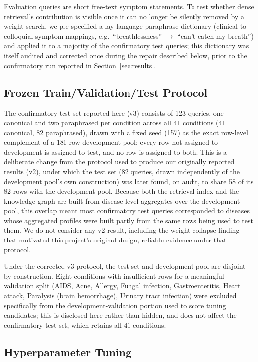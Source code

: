 \documentclass[10pt,conference]{IEEEtran}
\begin{document}
Evaluation queries are short free-text symptom statements. To test whether dense retrieval's contribution is visible once it can no longer be silently removed by a weight search, we pre-specified a lay-language paraphrase dictionary (clinical-to-colloquial symptom mappings, e.g.\ ``breathlessness'' $\rightarrow$ ``can't catch my breath'') and applied it to a majority of the confirmatory test queries; this dictionary was itself audited and corrected once during the repair described below, prior to the confirmatory run reported in Section~\ref{sec:results}.

\subsection{Frozen Train/Validation/Test Protocol}
\label{ssec:protocol}

The confirmatory test set reported here (v3) consists of 123 queries, one canonical and two paraphrased per condition across all 41 conditions (41 canonical, 82 paraphrased), drawn with a fixed seed (157) as the exact row-level complement of a 181-row development pool: every row not assigned to development is assigned to test, and no row is assigned to both. This is a deliberate change from the protocol used to produce our originally reported results (v2), under which the test set (82 queries, drawn independently of the development pool's own construction) was later found, on audit, to share 58 of its 82 rows with the development pool. Because both the retrieval index and the knowledge graph are built from disease-level aggregates over the development pool, this overlap meant most confirmatory test queries corresponded to diseases whose aggregated profiles were built partly from the same rows being used to test them. We do not consider any v2 result, including the weight-collapse finding that motivated this project's original design, reliable evidence under that protocol.

Under the corrected v3 protocol, the test set and development pool are disjoint by construction. Eight conditions with insufficient rows for a meaningful validation split (AIDS, Acne, Allergy, Fungal infection, Gastroenteritis, Heart attack, Paralysis (brain hemorrhage), Urinary tract infection) were excluded specifically from the development-validation portion used to score tuning candidates; this is disclosed here rather than hidden, and does not affect the confirmatory test set, which retains all 41 conditions.

\subsection{Hyperparameter Tuning}
\label{ssec:tuning}
\end{document}
